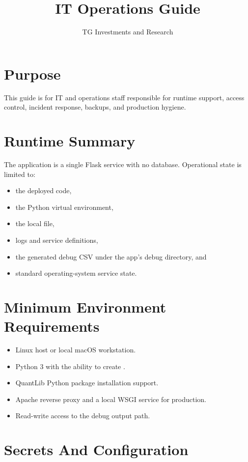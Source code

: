 \documentclass[11pt]{article}
\title{IT Operations Guide\\\large \product}
\author{TG Investments and Research}
\date{\docdate}
\begin{document}
\maketitle
\tableofcontents
\newpage

\section{Purpose}
This guide is for IT and operations staff responsible for runtime support, access control, incident response, backups, and production hygiene.

\section{Runtime Summary}
The application is a single Flask service with no database. Operational state is limited to:
\begin{itemize}[leftmargin=1.5em]
    \item the deployed code,
    \item the Python virtual environment,
    \item the local  file,
    \item logs and service definitions,
    \item the generated debug CSV under the app's debug directory, and
    \item standard operating-system service state.
\end{itemize}

\section{Minimum Environment Requirements}
\begin{itemize}[leftmargin=1.5em]
    \item Linux host or local macOS workstation.
    \item Python 3 with the ability to create .
    \item QuantLib Python package installation support.
    \item Apache reverse proxy and a local WSGI service for production.
    \item Read-write access to the debug output path.
\end{itemize}

\section{Secrets And Configuration}
\end{document}
